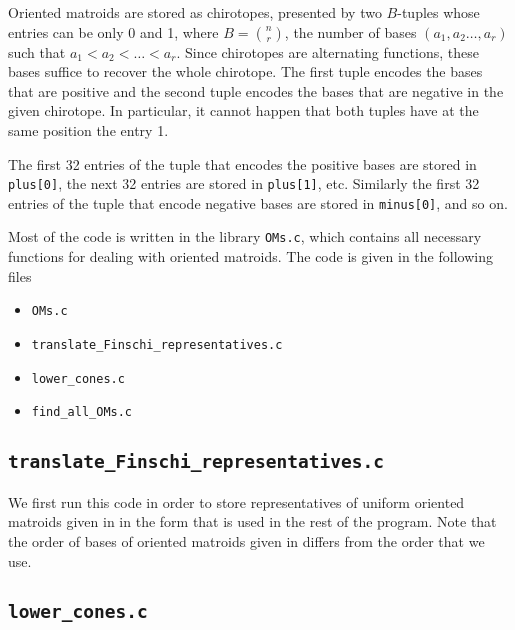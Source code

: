 \documentclass[11pt,twoside,a4paper]{article}
\theoremstyle{definition}
\theoremstyle{plain}
\begin{document}
Oriented matroids are stored as chirotopes, presented by two $B$-tuples whose entries can be only 0 and 1, where $B=\binom{n}{r}$, the number of bases $(a_1,a_2\dots,a_r)$ such that $a_1<a_2<\dots<a_r$. Since chirotopes are alternating functions, these bases suffice to recover the whole chirotope. The first tuple encodes the bases that are positive and the second tuple encodes the bases that are negative in the given chirotope. In particular, it cannot happen that both tuples have at the same position the entry 1. 

The first 32 entries of the tuple that encodes the positive bases are stored in \texttt{plus[0]}, the next 32 entries are stored in \texttt{plus[1]}, etc. Similarly the first 32 entries of the tuple that encode negative bases are stored in \texttt{minus[0]}, and so on.


Most of the code is written in the library \texttt{OMs.c}, which contains all necessary functions for dealing with oriented matroids. The code is given in the following files
\begin{itemize}
\item \texttt{OMs.c}
\item \texttt{translate\_Finschi\_representatives.c}
\item \texttt{lower\_cones.c}
\item \texttt{find\_all\_OMs.c}
\end{itemize}


\subsection{\texttt{translate\_Finschi\_representatives.c}}

We first run this code in order to store representatives of uniform oriented matroids given in \cite{Fin} in the form that is used in the rest of the program. Note that the order of bases of oriented matroids given in \cite{Fin} differs from the order that we use.



\subsection{\texttt{lower\_cones.c}}
\end{document}
